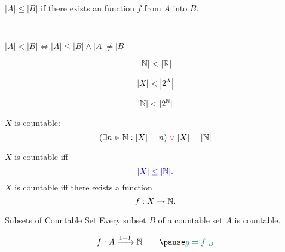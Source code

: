 \begin{frame}{}
\end{frame}

\begin{frame}{}
  \begin{definition}[$|A| \le |B|$]
    $|A| \le |B|$ if there exists an  function $f$ from $A$ into $B$.
  \end{definition}

  \pause
  \vspace{0.80cm}
  \begin{center}
    {} \\[8pt] \pause
    {}
  \end{center}
\end{frame}

\begin{frame}{}
  \begin{definition}[$|A| < |B|$]
    $|A| < |B| \iff |A| \le |B| \land |A| \neq |B|$
  \end{definition}

  \pause
  \[
    |\mathbb{N}| < |\mathbb{R}|
  \]

  \[
    |X| < |2^{X}|
  \]

  \[
    |\mathbb{N}| < |2^{\mathbb{N}}|
  \]
\end{frame}

\begin{frame}{}
  \begin{definition}
    $X$ is countable:
    \[
      (\exists n \in \mathbb{N}: |X| = n) \textcolor{red}{\;\lor\;} |X| = |\mathbb{N}|
    \]
  \end{definition}

  \pause
  \begin{theorem}
    $X$ is countable iff
    \[
      \textcolor{blue}{|X| \le |\mathbb{N}|.}
    \]
    \pause
    $X$ is countable iff there exists a  function
    \[
      f: X \to \mathbb{N}.
    \]
  \end{theorem}

  \pause
  \begin{exampleblock}{Subsets of Countable Set}
    Every subset $B$ of a countable set $A$ is countable.
  \end{exampleblock}

  \pause
  \[
    f: A \xrightarrow{1-1} \N \qquad \pause \teal{g = f|_{B}}
  \]
\end{frame}

